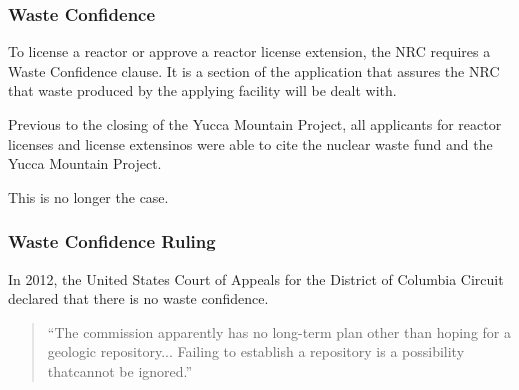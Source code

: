
\begin{frame}[ctb!]
    \frametitle{Waste Confidence}
    To license a reactor or approve a reactor license extension, the NRC 
    requires a Waste Confidence clause. It is a section of the application that 
    assures the NRC that waste produced by the applying facility will be dealt 
    with. 

    Previous to the closing of the Yucca Mountain Project, all applicants for 
    reactor licenses and license extensinos were able to cite the nuclear waste 
    fund and the Yucca Mountain Project. 

    This is no longer the case. 
  \end{frame}

\begin{frame}[ctb!]
    \frametitle{Waste Confidence Ruling}
    In 2012, the United States Court of Appeals for the District of Columbia Circuit declared that there is no waste confidence. 
    
    \begin{quotation} 
      ``The commission apparently has no long-term plan other than hoping for a
        geologic repository... Failing to establish a repository is a
        possibility thatcannot be ignored.'' \cite{sentelle_petitions_2012} 
    \end{quotation}
  \end{frame}

